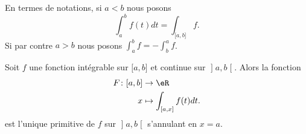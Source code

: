 En termes de notations, si \( a<b\) nous posons
\begin{equation}
	\int_a^bf(t)dt=\int_{\mathopen[ a , b \mathclose]}f.
\end{equation}
Si par contre \( a>b\) nous posons \( \int_a^bf=-\int_b^af\).

\begin{proposition} \label{PropEZFRsMj}
	Soit \( f\) une fonction intégrable sur \( \mathopen[ a , b \mathclose]\) et continue sur \( \mathopen] a , b \mathclose[\). Alors la fonction
		\begin{equation}
			\begin{aligned}
				F\colon \mathopen[ a , b \mathclose] & \to \eR                                            \\
				x                                    & \mapsto \int_{\mathopen[ a , x \mathclose]}f(t)dt.
			\end{aligned}
		\end{equation}
		est l'unique primitive de \( f\) sur \( \mathopen] a , b \mathclose[\) s'annulant en \( x=a\).
\end{proposition}

